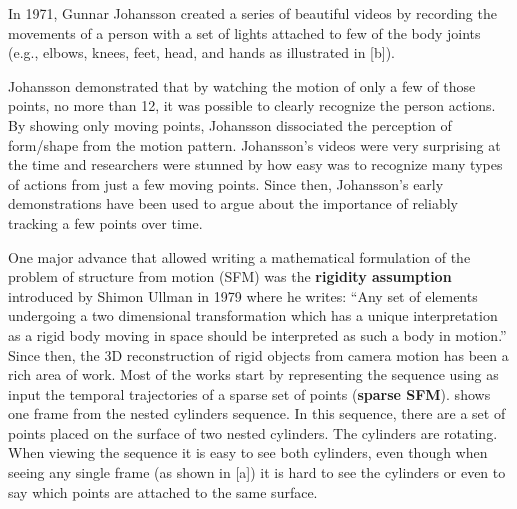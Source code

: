 
In 1971, Gunnar Johansson created a series of beautiful videos by recording the movements of a person with a set of lights attached to few of the body joints (e.g., elbows, knees, feet, head, and hands as illustrated in \fig{\ref{fig:demos_motivation_sfm}}[b]). 


Johansson \cite{Johansson1973} demonstrated that by watching the motion of only a few of those points, no more than 12, it was possible to clearly recognize the person actions. By showing only moving points, Johansson dissociated the perception of form/shape from the motion pattern. Johansson's videos were very surprising at the time and researchers were stunned by how easy was to recognize many types of actions from just a few moving points. 
Since then, Johansson's early demonstrations have been used to argue about the importance of reliably tracking a few points over time. 









One major advance that allowed writing a mathematical formulation of the problem of structure from motion (SFM) was the {\bf rigidity assumption} introduced by Shimon Ullman in 1979 \cite{Ullman1979} where he writes: ``Any set of elements undergoing a two dimensional transformation which has a unique interpretation as a rigid body moving in space should be interpreted as such a body in motion.'' Since then, the 3D reconstruction of rigid objects from camera motion has been a rich area of work. Most of the works start by representing the sequence using as input the temporal trajectories of a sparse set of points ({\bf sparse SFM}).  shows one frame from the nested cylinders sequence. In this sequence, there are a set of points placed on the surface of two nested cylinders. The cylinders are rotating. When viewing the sequence it is easy to see both cylinders, even though when seeing any single frame (as shown in \fig{\ref{fig:demos_motivation_sfm}}[a]) it is hard to see the cylinders or even to say which points are attached to the same surface. 

